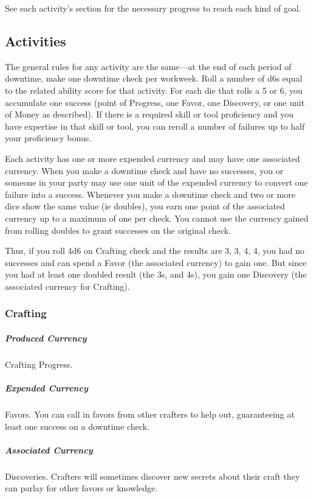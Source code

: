 See each activity's section for the necessary progress to reach each kind of goal.

\subsection{Activities}
The general rules for any activity are the same---at the end of each period of downtime, make one downtime check per workweek. Roll a number of d6s equal to the related ability score for that activity. For each die that rolls a 5 or 6, you accumulate one success (point of Progress, one Favor, one Discovery, or one unit of Money as described). If there is a required skill or tool proficiency and you have expertise in that skill or tool, you can reroll a number of failures up to half your proficiency bonus.

Each activity has one or more expended currency and may have one associated currency. When you make a downtime check and have no successes, you or someone in your party may use one unit of the expended currency to convert one failure into a success. Whenever you make a downtime check and two or more dice show the same value (ie doubles), you earn one point of the associated currency up to a maximum of one per check. You cannot use the currency gained from rolling doubles to grant successes on the original check.

Thus, if you roll 4d6 on Crafting check and the results are 3, 3, 4, 4, you had no successes and can spend a Favor (the associated currency) to gain one. But since you had at least one doubled result (the 3s, and 4s), you gain one Discovery (the associated currency for Crafting).

\subsubsection{Crafting}
\subparagraph*{Produced Currency} Crafting Progress.
\subparagraph*{Expended Currency} Favors. You can call in favors from other crafters to help out, guaranteeing at least one success on a downtime check.
\subparagraph*{Associated Currency} Discoveries. Crafters will sometimes discover new secrets about their craft they can parlay for other favors or knowledge.

